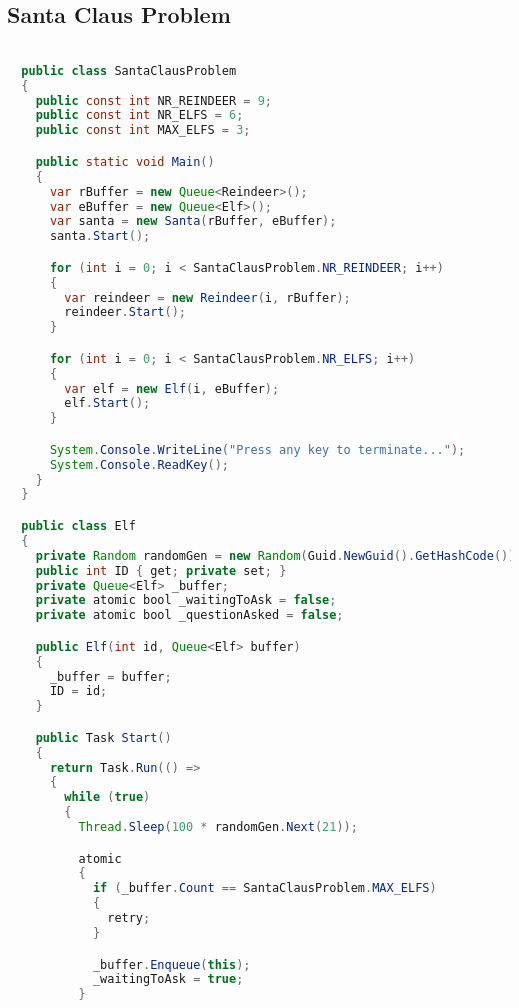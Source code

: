 \subsection{Santa Claus Problem}
\begin{lstlisting}[label=lst:impl_dining_lib,
  caption={\stmname Based Santa Claus Implementation},
  language=Java,  
  showspaces=false,
  showtabs=false,
  breaklines=true,
  showstringspaces=false,
  breakatwhitespace=true,
  commentstyle=\color{greencomments},
  keywordstyle=\color{bluekeywords},
  stringstyle=\color{redstrings},
  escapechar=~,
  morekeywords={atomic, retry, orelse, var, get, set, ref, out, readonly, virtual, override, region, endregion, foreach, lock}]  % Start your code-block

  public class SantaClausProblem
  {
    public const int NR_REINDEER = 9;
    public const int NR_ELFS = 6;
    public const int MAX_ELFS = 3;

    public static void Main()
    {
      var rBuffer = new Queue<Reindeer>();
      var eBuffer = new Queue<Elf>();
      var santa = new Santa(rBuffer, eBuffer);
      santa.Start();

      for (int i = 0; i < SantaClausProblem.NR_REINDEER; i++)
      {
        var reindeer = new Reindeer(i, rBuffer);
        reindeer.Start();
      }

      for (int i = 0; i < SantaClausProblem.NR_ELFS; i++)
      {
        var elf = new Elf(i, eBuffer);
        elf.Start();
      }

      System.Console.WriteLine("Press any key to terminate...");
      System.Console.ReadKey();
    }
  }

  public class Elf
  {
    private Random randomGen = new Random(Guid.NewGuid().GetHashCode());
    public int ID { get; private set; }
    private Queue<Elf> _buffer;
    private atomic bool _waitingToAsk = false;
    private atomic bool _questionAsked = false;

    public Elf(int id, Queue<Elf> buffer)
    {
      _buffer = buffer;
      ID = id;
    }

    public Task Start()
    {
      return Task.Run(() =>
      {
        while (true)
        {
          Thread.Sleep(100 * randomGen.Next(21));

          atomic
          {
            if (_buffer.Count == SantaClausProblem.MAX_ELFS)
            {
              retry;
            }

            _buffer.Enqueue(this);
            _waitingToAsk = true;
          }


\end{lstlisting}
